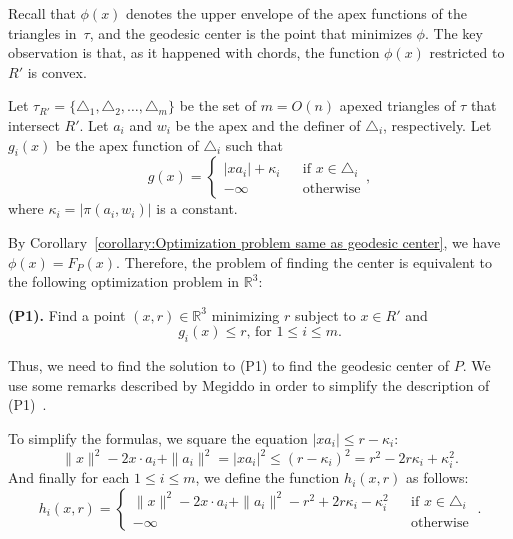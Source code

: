 \documentclass[a4paper]{article}
\newcommand{\F}[2]{\ensuremath{F_{\scriptscriptstyle #1}(#2)}}
\newcommand{\g}[2]{\ensuremath{|\pi(#1, #2)|}}
\newcommand{\reg}{\ensuremath{R'}}
\newcommand{\tcells}{4-cells\xspace}
\begin{document}
Recall that $\phi(x)$ denotes the upper envelope of the apex functions of the triangles in~$\tau$, and the geodesic center is the point that minimizes $\phi$.
The key observation is that, as it happened with chords, the function $\phi(x)$ restricted to $\reg$ is convex. 

Let $\tau_{\reg}  = \{\triangle_{1}, \triangle_{2}, \ldots, \triangle_{m}\}$ be the set of $m= O(n)$ apexed triangles of $\tau$ that intersect $\reg$. 
Let $a_i$ and $w_i$ be the apex and the definer of $\triangle_i$, respectively.
Let $g_i(x)$  be the apex function of $\triangle_i$ such that 
$$g(x) = \left\{ \begin{array}{lll}
|x a_i| + \kappa_i && \text{if }x\in \triangle_i\\
-\infty&&\text{otherwise}
\end{array}\right. ,$$
where $\kappa_i = \g{a_i}{w_i}$ is a constant.

By Corollary~\ref{corollary:Optimization problem same as geodesic center}, we have $\phi(x) = \F{P}{x}$. 
Therefore, the problem of finding the center is equivalent to the following optimization problem in $\mathbb{R}^3$:

\textbf{(P1).} Find a point $(x,r)\in \mathbb{R}^3$ minimizing $r$ subject to $x\in \reg$ and
$$\text{$g_i(x) \leq r$, for $1\leq i \leq m$}.$$

Thus, we need to find the solution to (P1) to find the geodesic center of $P$.
We use some remarks described by Megiddo in order to simplify the description of (P1)~\cite{megiddo1989ball}.

To simplify the formulas, we square the equation $|x a_i| \leq r - \kappa_i$:
$$\|x\|^2 - 2x\cdot a_i + \|a_i\|^2  = |x a_i|^2 \leq (r - \kappa_i)^2 = r^2 - 2r\kappa_i + \kappa_i^2.$$ 
And finally for each $1\leq i\leq m$, we define the function $h_i(x, r)$ as follows:
$$h_i(x, r) = \left\{ \begin{array}{lll}
 \|x\|^2 - 2x\cdot a_i + \|a_i\|^2  - r^2 + 2r\kappa_i - \kappa_i^2 && \text{if }x\in \triangle_i\\
-\infty&&\text{otherwise}
\end{array}\right. \ .$$
\end{document}

